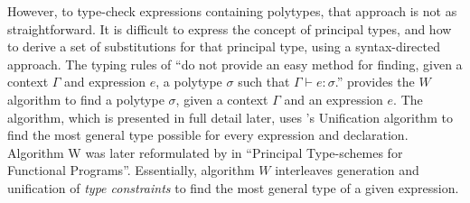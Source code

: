 However, to type-check expressions containing polytypes, that approach is not as straightforward.
It is difficult to express the concept of principal types, and how to derive a set of substitutions for that principal type, using a syntax-directed approach.
The typing rules of \citeauthor{damas1982principal} ``do not provide an easy method for finding, given a context $\Gamma$ and expression $e$, a polytype $\sigma$ such that $\Gamma \vdash e : \sigma$.''\cite{damas1982principal}
\citeauthor{milner1978theory} provides the $W$ algorithm to find a polytype $\sigma$, given a context $\Gamma$ and an expression $e$.
The algorithm, which is presented in full detail later, uses \citeauthor{robinson1965machine}'s Unification\cite{robinson1965machine} algorithm to find the most general type possible for every expression and declaration.
Algorithm W was later reformulated by \citeauthor{damas1982principal} in ``Principal Type-schemes for Functional Programs''\cite{damas1982principal}.
Essentially, algorithm $W$ interleaves generation and unification of \textit{type constraints} to find the most general type of a given expression.

